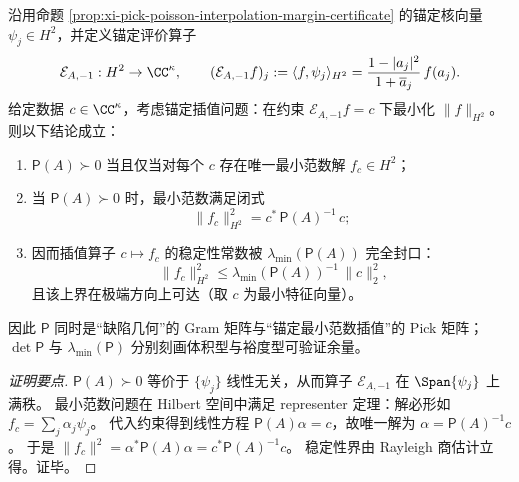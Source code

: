 \begin{proposition}\label{prop:xi-anchored-hardy-interpolation-pick-equivalence}
沿用命题 \ref{prop:xi-pick-poisson-interpolation-margin-certificate} 的锚定核向量 \(\psi_j\in H^2\)，并定义锚定评价算子
\[
\mathcal{E}_{A,-1}:H^2\to\CC^{\kappa},
\qquad
(\mathcal{E}_{A,-1}f)_j:=\langle f,\psi_j\rangle_{H^2}
=\frac{1-|a_j|^2}{1+\overline a_j}\,f(a_j).
\]
给定数据 \(c\in\CC^{\kappa}\)，考虑锚定插值问题：在约束 \(\mathcal{E}_{A,-1}f=c\) 下最小化 \(\|f\|_{H^2}\)。
则以下结论成立：
\begin{enumerate}
  \item \(\mathsf P(A)\succ 0\) 当且仅当对每个 \(c\) 存在唯一最小范数解 \(f_c\in H^2\)；
  \item 当 \(\mathsf P(A)\succ 0\) 时，最小范数满足闭式
  \[
  \boxed{\;
  \|f_c\|_{H^2}^2=c^\ast\,\mathsf P(A)^{-1}\,c;\;}
  \]
  \item 因而插值算子 \(c\mapsto f_c\) 的稳定性常数被 \(\lambda_{\min}(\mathsf P(A))\) 完全封口：
  \[
  \boxed{\;
  \|f_c\|_{H^2}^2\le \lambda_{\min}(\mathsf P(A))^{-1}\,\|c\|_2^2,}
  \]
  且该上界在极端方向上可达（取 \(c\) 为最小特征向量）。
\end{enumerate}
因此 \(\mathsf P\) 同时是“缺陷几何”的 Gram 矩阵与“锚定最小范数插值”的 Pick 矩阵；\(\det\mathsf P\) 与 \(\lambda_{\min}(\mathsf P)\) 分别刻画体积型与裕度型可验证余量。
\end{proposition}
\begin{proof}[证明要点]
\(\mathsf P(A)\succ 0\) 等价于 \(\{\psi_j\}\) 线性无关，从而算子 \(\mathcal{E}_{A,-1}\) 在 \(\Span\{\psi_j\}\) 上满秩。
最小范数问题在 Hilbert 空间中满足 representer 定理：解必形如 \(f_c=\sum_j \alpha_j\psi_j\)。
代入约束得到线性方程 \(\mathsf P(A)\alpha=c\)，故唯一解为 \(\alpha=\mathsf P(A)^{-1}c\)。
于是
\(
\|f_c\|^2=\alpha^\ast \mathsf P(A)\alpha=c^\ast\mathsf P(A)^{-1}c
\)。
稳定性界由 Rayleigh 商估计立得。证毕。
\end{proof}

